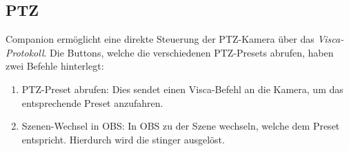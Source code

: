 		\subsection{PTZ}
			Companion ermöglicht eine direkte Steuerung der \Gls{PTZ-Kamera} über das \textit{\Gls{Visca}-Protokoll}.
			Die Buttons, welche die verschiedenen PTZ-Presets abrufen, haben zwei Befehle hinterlegt:
			\begin{enumerate}
				\item PTZ-Preset abrufen: Dies sendet einen \Gls{Visca}-Befehl an die Kamera, um das entsprechende Preset anzufahren.
				\item Szenen-Wechsel in \Gls{OBS}: In \Gls{OBS} zu der Szene wechseln, welche dem Preset entspricht.
				Hierdurch wird die \Gls{stinger} ausgelöst.
			\end{enumerate}